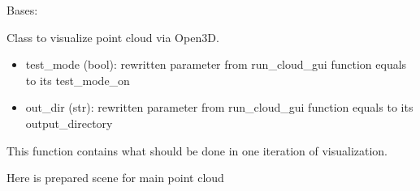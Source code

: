 \documentclass[letterpaper,10pt,english]{sphinxmanual}
\begin{document}
\begin{fulllineitems}
\label{\detokenize{src:src.point_cloud_visualizer.Viewer3D}}
\pysigstartsignatures
{}
\pysigstopsignatures
\sphinxAtStartPar
Bases: 

\sphinxAtStartPar
Class to visualize point cloud via Open3D.
\begin{description}
\begin{itemize}
\item {} 
\sphinxAtStartPar
test\_mode (bool): rewritten parameter from run\_cloud\_gui function equals to its test\_mode\_on

\item {} 
\sphinxAtStartPar
out\_dir    (str): rewritten parameter from run\_cloud\_gui function equals to its output\_directory

\end{itemize}

\end{description}

\begin{fulllineitems}
\label{\detokenize{src:src.point_cloud_visualizer.Viewer3D.run_one_tick}}
\pysigstartsignatures
{}
\pysigstopsignatures
\sphinxAtStartPar
This function contains what should be done in one iteration of visualization.

\end{fulllineitems}


\begin{fulllineitems}
\label{\detokenize{src:src.point_cloud_visualizer.Viewer3D.setup_o3d_scene}}
\pysigstartsignatures
{}
\pysigstopsignatures
\sphinxAtStartPar
Here is prepared scene for main point cloud


\end{fulllineitems}
\end{fulllineitems}
\end{document}

